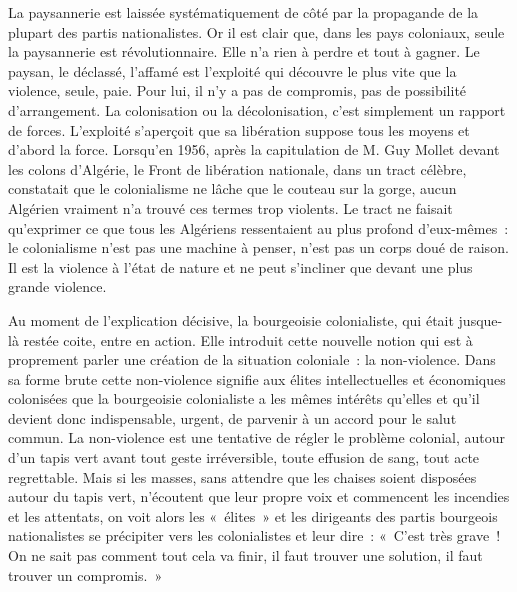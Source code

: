 \documentclass[french,twoside]{book} %
\begin{document}
\bigbreak
\noindent La paysannerie est laissée systématiquement de côté par la propagande de la plupart des partis nationalistes. Or il est clair que, dans les pays coloniaux, seule la paysannerie est révolutionnaire. Elle n’a rien à perdre et tout à gagner. Le paysan, le déclassé, l’affamé est l’exploité qui découvre le plus vite que la violence, seule, paie. Pour lui, il n’y a pas de compromis, pas de possibilité d’arrangement. La colonisation ou la décolonisation, c’est simplement un rapport de forces. L’exploité s’aperçoit que sa libération suppose tous les moyens et d’abord la force. Lorsqu’en 1956, après la capitulation de M. Guy Mollet devant les colons d’Algérie, le Front de libération nationale, dans un tract célèbre, constatait que le colonialisme ne lâche que le couteau sur la gorge, aucun Algérien vraiment n’a trouvé ces termes trop violents. Le tract ne faisait qu’exprimer ce que tous les Algériens ressentaient au plus profond d’eux-mêmes : le colonialisme n’est pas une machine à penser, n’est pas un corps doué de raison. Il est la violence à l’état de nature et ne peut s’incliner que devant une plus grande violence.\par
\bigbreak
\noindent Au moment de l’explication décisive, la bourgeoisie colonialiste, qui était jusque-là restée coite, entre en action. Elle introduit cette nouvelle notion qui est à proprement parler une création de la situation coloniale : la non-violence. Dans sa forme brute cette non-violence signifie aux élites intellectuelles et économiques colonisées que la bourgeoisie colonialiste a les mêmes intérêts qu’elles et qu’il devient donc indispensable,   urgent, de parvenir à un accord pour le salut commun. La non-violence est une tentative de régler le problème colonial, autour d’un tapis vert avant tout geste irréversible, toute effusion de sang, tout acte regrettable. Mais si les masses, sans attendre que les chaises soient disposées autour du tapis vert, n’écoutent que leur propre voix et commencent les incendies et les attentats, on voit alors les « élites » et les dirigeants des partis bourgeois nationalistes se précipiter vers les colonialistes et leur dire : « C’est très grave ! On ne sait pas comment tout cela va finir, il faut trouver une solution, il faut trouver un compromis. »\par
\bigbreak
\end{document}
